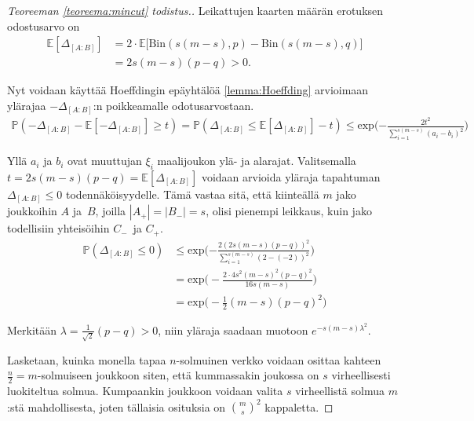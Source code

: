\documentclass[finnish,12pt,a4paper,pdftex,sci,utf8]{aaltothesis}
\begin{document}
\begin{proof}[Teoreeman \ref{teoreema:mincut} todistus.]
Leikattujen kaarten määrän erotuksen odostusarvo on 
\begin{align*}
	\mathbb{E}[\Delta_{[A:B]}] &= 2 \cdot \mathbb{E} \big[ \text{Bin}(s(m-s), p) - \text{Bin}(s(m-s), q) \big] \\
	&= 2 s(m-s)(p-q) > 0.
\end{align*}

Nyt voidaan käyttää Hoeffdingin epäyhtälöä \ref{lemma:Hoeffding} arvioimaan ylärajaa $ -\Delta_{[A:B]}$:n poikkeamalle odotusarvostaan.
\begin{align*}
	\mathbb{P}(- \Delta_{[A:B]} - \mathbb{E}[- \Delta_{[A:B]}] \geq t) = \mathbb{P}(\Delta_{[A:B]} \leq \mathbb{E}[\Delta_{[A:B]}] - t) \leq \text{exp}\bigg({-\frac{2t^2}{\sum_{i=1}^{s(m-s)}(a_i - b_i)^2}}\bigg)
\end{align*}

Yllä $a_i$ ja $b_i$ ovat muuttujan $\xi_i$ maalijoukon ylä- ja alarajat. Valitsemalla $t = 2s(m-s)(p-q) = \mathbb{E}[\Delta_{[A:B]}]$ voidaan arvioida yläraja tapahtuman $\Delta_{[A:B]} \leq 0$ todennäköisyydelle. Tämä vastaa sitä, että kiinteällä $m$ jako joukkoihin $A$ ja $B$, joilla $|A_+| = |B_-| = s$, olisi pienempi leikkaus, kuin jako todellisiin yhteisöihin $C_-$ ja $C_+$.
\begin{align*}
	\mathbb{P}(\Delta_{[A:B]} \leq 0) & \leq \text{exp}\bigg({-\frac{2(2s(m-s)(p-q))^2}{\sum_{i=1}^{s(m-s)}(2-(-2))^2}}\bigg) \\
	&= \text{exp}\bigg(-\frac{2 \cdot 4s^2(m-s)^2(p-q)^2}{16s(m-s)}\bigg)\\
	&= \text{exp} \big(-\frac{1}{2}(m-s)(p-q)^2 \big)
\end{align*}

Merkitään $\lambda = \frac{1}{\sqrt2}(p-q) > 0$, niin yläraja saadaan muotoon $e^{-s(m-s)\lambda^2}$.

Lasketaan, kuinka monella tapaa $n$-solmuinen verkko voidaan osittaa kahteen $\frac{n}{2} = m$-solmuiseen joukkoon siten, että kummassakin joukossa on $s$ virheellisesti luokiteltua solmua. Kumpaankin joukkoon voidaan valita $s$ virheellistä solmua $m$:stä mahdollisesta, joten tällaisia osituksia on $\binom{m}{s}^2$ kappaletta.


\end{proof}
\end{document}
